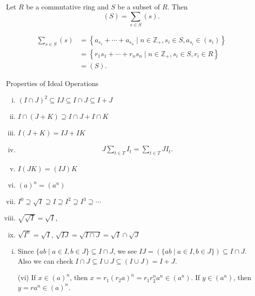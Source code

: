 \begin{proposition}{}{}
    Let $R$ be a commutative ring and $S$ be a subset of $R$. Then 
    $$(S)=\sum_{s\in S}(s).$$
\end{proposition}

\begin{prf}
    \begin{align*}
        \sum_{s \in S} (s)&=\left\{a_{s_1}+ \cdots +a_{s_n}\mid n\in\mathbb{Z}_{+},s_i\in S,a_{s_i}\in (s_i)\right\}\\
        &=\left\{r_1s_{1}+ \cdots +r_ns_{n}\mid n\in\mathbb{Z}_{+},s_i\in S,r_i\in R\right\}\\
        &=(S).
    \end{align*}
\end{prf}


\begin{proposition}{Properties of Ideal Operations}{}
    \begin{enumerate}[(i)]
        \item $(I\cap J)^2 \subseteq I J \subseteq I \cap J \subseteq I+J$
        \item ${I} \cap({J}+{K}) \supseteq {I} \cap {J}+{I} \cap {K}$
        \item ${I} ({J}+{K}) = {I}  {J}+{I}  {K}$
        \item $$
        \begin{gathered}
        J\sum_{t \in T} I_t=\sum_{t \in T} J I_t.
        \end{gathered}
        $$
        \item $I(J K)=(I J) K$
        \item $(a)^n=(a^n)$
        \item $I^0 \supseteq \sqrt{I} \supseteq I \supseteq I^2 \supseteq I^3 \supseteq \cdots$
        \item $\sqrt{\sqrt{I}} = \sqrt{I}$,
        \item $\sqrt{I^n}=\sqrt{I}$, $\sqrt{I J}=\sqrt{I \cap J}=\sqrt{I} \cap \sqrt{J}$
    \end{enumerate}
\end{proposition}

\begin{prf}
    \begin{enumerate}[(i)]
        \item Since $\{ab\mid a\in I,b\in J\}\subseteq I\cap J$, we see $IJ=\left(\{ab\mid a\in I,b\in J\}\right)\subseteq I\cap J$. Also we can check $I \cap J \subseteq I \cup J\subseteq (I \cup J)=I+J$.
        \item[(vi)] If $x\in(a)^n$, then $x=r_1(r_2a)^n=r_1r_2^na^n\in(a^n)$. If $y\in(a^n)$, then $y=ra^n\in(a)^n$.
    \end{enumerate}
\end{prf}


